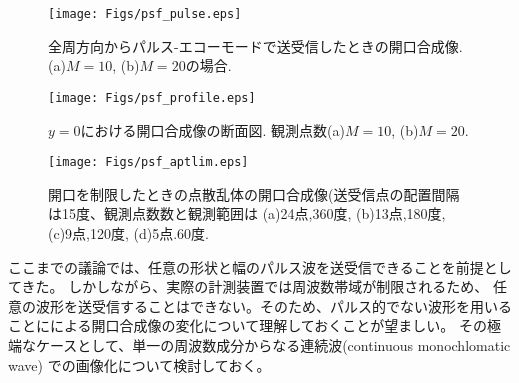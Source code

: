 \documentclass[10pt,a4j,dvipdfmx]{jarticle}
\begin{document}
\begin{figure}[h]
	\begin{center}
	\texttt{[image: Figs/psf\_pulse.eps]} 
	\end{center}
	\caption{全周方向からパルス-エコーモードで送受信したときの開口合成像.(a)$M=10$, (b)$M=20$の場合.} 
	\label{fig:psf_pulse}
\end{figure}
\begin{figure}[h]
	\begin{center}
	\texttt{[image: Figs/psf\_profile.eps]} 
	\end{center}
	\caption{$y=0$における開口合成像の断面図. 観測点数(a)$M=10$, (b)$M=20$.}
	\label{fig:psf_profile} 
\end{figure}
\begin{figure}[h]
	\begin{center}
	\texttt{[image: Figs/psf\_aptlim.eps]} 
	\end{center}
	\caption{開口を制限したときの点散乱体の開口合成像(送受信点の配置間隔は15度、観測点数数と観測範囲は
	(a)24点,360度, (b)13点,180度, (c)9点,120度, (d)5点.60度.} 
	\label{fig:}
\end{figure}
ここまでの議論では、任意の形状と幅のパルス波を送受信できることを前提としてきた。
しかしながら、実際の計測装置では周波数帯域が制限されるため、
任意の波形を送受信することはできない。そのため、パルス的でない波形を用いる
ことにによる開口合成像の変化について理解しておくことが望ましい。
その極端なケースとして、単一の周波数成分からなる連続波(continuous monochlomatic wave)
での画像化について検討しておく。
\end{document}
